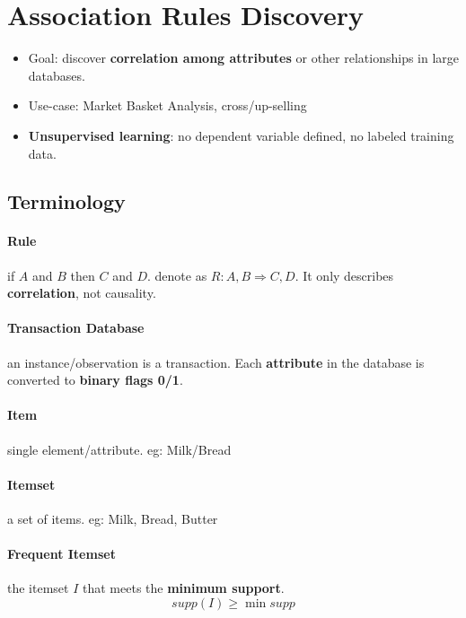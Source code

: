 \section{Association Rules Discovery}
\begin{itemize}
	\item Goal: discover \textbf{correlation among attributes} or other relationships in large databases.
	\item Use-case: Market Basket Analysis, cross/up-selling
	\item \textbf{Unsupervised learning}: no dependent variable defined, no labeled training data.
\end{itemize}

\subsection{Terminology}

\paragraph{Rule} if $A$ and $B$ then $C$ and $D$. denote as $R: A,B \Rightarrow C,D$. It only describes \textbf{correlation}, not causality. 



\paragraph{Transaction Database} an instance/observation is a transaction. Each \textbf{attribute} in the database is converted to \textbf{binary flags 0/1}. 
\paragraph{Item} single element/attribute. eg: Milk/Bread
\paragraph{Itemset} a set of items. eg: {Milk, Bread, Butter}
\paragraph{Frequent Itemset} the itemset $I$ that meets the \textbf{minimum support}. $$supp(I) \geq \min supp$$

